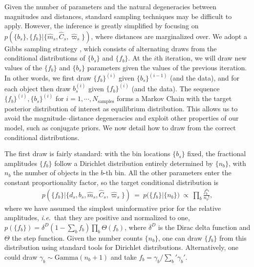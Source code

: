\documentclass[manuscript, letterpaper]{aastex6}
\newcommand{\ie}{{\textit{i.e.}~}}
\newcommand{\eg}{{\textit{e.g.},~}}
\newcommand{\eqn}[1]{\begin{eqnarray}#1\end{eqnarray}}
\begin{document}
Given the number of parameters and the natural degeneracies between magnitudes and distances, standard sampling techniques may be difficult to apply.
However, the inference is greatly simplified by focusing on $p(\{ b_s \}, \{ f_{b} \} | \{ \hat{m}_s, \hat{C}_s, \hat{\varpi}_s \})$, where distances are marginalized over.
We adopt a Gibbs sampling strategy \citep[see \eg][]{Casella1992, Wandelt2004, Levin2009, brooks2011handbook}, which consists of alternating draws from the conditional distributions of $\{ b_s \}$ and $\{ f_{b} \}$.
At the $i$th iteration, we will draw new values of the $\{ f_{b} \}$ and $\{b_s\}$ parameters given the values of the previous iteration.
In other words, we first draw $\{ f_{b} \}^{(i)}$ given $\{b_s\}^{(i-1)}$ (and the data), and for each object then draw $b_s^{(i)}$ given $\{ f_{b} \}^{(i)}$ (and the data). 
The sequence $\{ f_{b} \}^{(i)},\{b_s\}^{(i)}$ for $i=1, \cdots, N_\mathrm{samples}$ forms a Markov Chain with the target posterior distribution of interest as equilibrium distribution.
This allows us to avoid the magnitude--distance degeneracies and exploit other properties of our model, such as conjugate priors.
We now detail how to draw from the correct conditional distributions.

The first draw is fairly standard: with the bin locations $\{b_s\}$ fixed, the fractional amplitudes $\{ f_{b} \}$ follow a Dirichlet distribution entirely determined by $\{n_b \}$, with $n_b$ the number of objects in the $b$-th bin.
All the other parameters enter the constant proportionality factor, so the target conditional distribution is
\eqn{
	p\left(\bigl\{ f_b \bigr\} \bigr\rvert \bigl\{ d_s, b_s, \hat{m}_s, \hat{C}_s, \hat{\varpi}_s \bigr\} \right) \ = \ p\bigl( \bigl\{ f_b \bigr\} \bigr\rvert \{n_b \} \bigr) \ \propto\  \prod_b \frac{ f_b^{n_b} }{n_b !},
}
where we have assumed the simplest uninformative prior for the relative amplitudes, \ie that they are positive and normalized to one, $p(\bigl\{ f_b \bigr\}) = \delta^D(1 - \sum_b f_b) \prod_b \Theta(f_b)$, where $\delta^D$ is the Dirac delta function and $\Theta$ the step function.
Given the number counts $\{n_b \}$, one can draw $\{ f_b \}$ from this distribution using standard tools for Dirichlet distributions. 
Alternatively, one could draw $\gamma_b \sim \mathrm{Gamma}(n_b + 1)$ and take $f_b = \gamma_b / \sum_b' \gamma_b'$.
\end{document}
